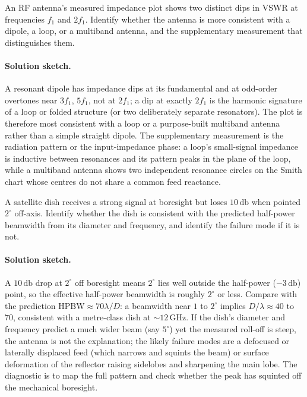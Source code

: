 \begin{exercise}
An RF antenna's measured impedance plot shows two distinct dips in
VSWR at frequencies $f_{1}$ and $2f_{1}$. Identify whether the antenna
is more consistent with a dipole, a loop, or a multiband antenna, and
the supplementary measurement that distinguishes them.
\paragraph{Solution sketch.} A resonant dipole has impedance dips at its
fundamental and at odd-order overtones near $3f_{1}$, $5f_{1}$, not at
$2f_{1}$; a dip at exactly $2f_{1}$ is the harmonic signature of a loop
or folded structure (or two deliberately separate resonators). The plot
is therefore most consistent with a loop or a purpose-built multiband
antenna rather than a simple straight dipole. The supplementary
measurement is the radiation pattern or the input-impedance phase: a
loop's small-signal impedance is inductive between resonances and its
pattern peaks in the plane of the loop, while a multiband antenna shows
two independent resonance circles on the Smith chart whose centres do
not share a common feed reactance.
\end{exercise}

\begin{exercise}
A satellite dish receives a strong signal at boresight but loses
$10\,\si{\decibel}$ when pointed $2^{\circ}$ off-axis. Identify
whether the dish is consistent with the predicted half-power
beamwidth from its diameter and frequency, and identify the failure
mode if it is not.
\paragraph{Solution sketch.} A $10\,\si{\decibel}$ drop at $2^{\circ}$
off boresight means $2^{\circ}$ lies well outside the half-power
($-3\,\si{\decibel}$) point, so the effective half-power beamwidth is
roughly $2^{\circ}$ or less. Compare with the prediction $\text{HPBW}
\approx 70\lambda/D$: a beamwidth near $1$ to $2^{\circ}$ implies $D/
\lambda\approx 40$ to $70$, consistent with a metre-class dish at
$\sim 12\,\si{\giga\hertz}$. If the dish's diameter and frequency
predict a much wider beam (say $5^{\circ}$) yet the measured roll-off is
steep, the antenna is not the explanation; the likely failure modes are
a defocused or laterally displaced feed (which narrows and squints the
beam) or surface deformation of the reflector raising sidelobes and
sharpening the main lobe. The diagnostic is to map the full pattern and
check whether the peak has squinted off the mechanical boresight.
\end{exercise}

